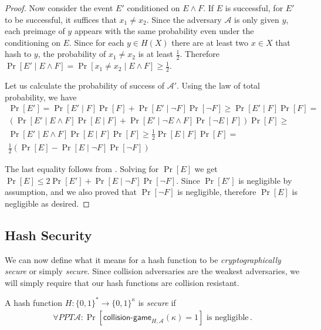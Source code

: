 \begin{proof}
  Now consider the event $E'$ conditioned on $E \land F$. If $E$ is successful, for $E'$ to be successful, it suffices that
  $x_1 \neq x_2$. Since the adversary $\mathcal{A}$ is only given $y$,
  each preimage of $y$ appears with the same probability even under the conditioning on $E$.
  Since for each $y \in H(X)$ there
  are at least two $x \in X$ that hash to $y$, the probability of $x_1 \neq x_2$ is at
  least $\frac{1}{2}$. Therefore
  $\Pr[E' \mid E \land F] = \Pr[x_1 \neq x_2 \mid E \land F] \geq \frac{1}{2}$.

  Let us calculate the probability of success of $\mathcal{A}'$. Using the law of total probability,
  we have
  \begin{align*}
    \Pr[E'] = \Pr[E' \mid F] \Pr[F] + \Pr[E' \mid \neg F] \Pr[\neg F] \geq
    \Pr[E' \mid F] \Pr[F] =\\
    \left(\Pr[E' \mid E \land F] \Pr[E \mid F]
    + \Pr[E' \mid \neg E \land F] \Pr[\neg E \mid F]\right) \Pr[F] \geq\\
    \Pr[E' \mid E \land F] \Pr[E \mid F] \Pr[F] \geq
    \frac{1}{2} \Pr[E \mid F] \Pr[F] = \\
    \frac{1}{2} \left(\Pr[E] - \Pr[E \mid \neg F] \Pr[\neg F]\right)
  \end{align*}

  The last equality follows from .
  Solving for $\Pr[E]$ we get $\Pr[E] \leq 2 \Pr[E'] + \Pr[E \mid \neg F] \Pr[\neg F]$.
  Since $\Pr[E']$ is negligible by assumption, and we also proved that $\Pr[\neg F]$ is negligible,
  therefore $\Pr[E]$ is negligible as desired.
\end{proof}

\subsection*{Hash Security}

We can now define what it means for a hash function to be \emph{cryptographically secure}
or simply \emph{secure}. Since collision adversaries are the weakest adversaries, we will
simply require that our hash functions are collision resistant.

\begin{definition}
  A hash function $H: \{0, 1\}^* \longrightarrow \{0, 1\}^\kappa$ is \emph{secure} if
  \begin{gather*}
    \forall PPT \mathcal{A}:
    \Pr[\textsf{collision-game}_{H,\mathcal{A}}(\kappa) = 1] \text{ is negligible}\,.
  \end{gather*}
\end{definition}

